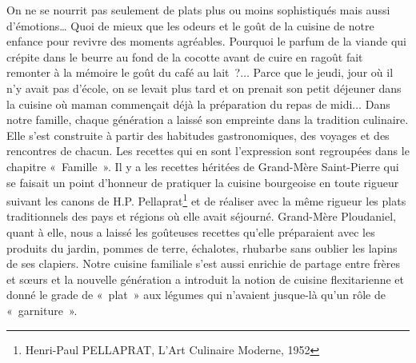 On ne se nourrit pas seulement de plats plus ou moins sophistiqués mais aussi d'émotions… Quoi de mieux que les odeurs et le goût de la cuisine de notre enfance pour revivre des moments agréables. Pourquoi le parfum de la viande qui crépite dans le beurre au fond de la cocotte avant de cuire en ragoût fait remonter à la mémoire le goût du café au lait ?$\ldots$ Parce que le jeudi, jour où il n’y avait pas d’école, on se levait plus tard et on prenait son petit déjeuner dans la cuisine où maman commençait déjà la préparation du repas de midi$\ldots$
Dans notre famille, chaque génération a laissé son empreinte dans la tradition culinaire. Elle s’est construite à partir des habitudes gastronomiques, des voyages et des rencontres de chacun. Les recettes qui en sont l’expression sont regroupées dans le chapitre « Famille ». Il y a les recettes héritées de Grand-Mère Saint-Pierre qui se faisait un point d’honneur de pratiquer la cuisine bourgeoise en toute rigueur suivant les canons de H.P. Pellaprat\footnote{Henri-Paul PELLAPRAT, L’Art Culinaire Moderne, 1952} et de réaliser avec la même rigueur les plats traditionnels des pays et régions où elle avait séjourné. Grand-Mère Ploudaniel, quant à elle, nous a laissé les goûteuses recettes qu’elle préparaient avec les produits du jardin, pommes de terre, échalotes, rhubarbe sans oublier les lapins de ses clapiers. Notre cuisine familiale s’est aussi enrichie de partage entre frères et sœurs et la nouvelle génération a introduit la notion de cuisine flexitarienne et donné le grade de « plat » aux légumes qui n’avaient jusque-là qu’un rôle de « garniture ».
